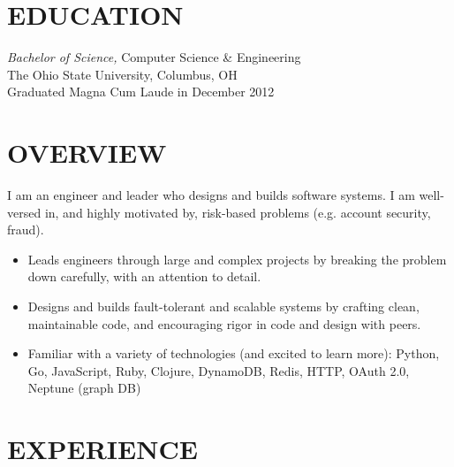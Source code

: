 \documentclass[line,letterpaper]{resume}
\begin{document}
\address{\href{https://www.ryanmcg.com}{Personal website --- https://www.ryanmcg.com}}
\address{\href{mailto:ryan@ryanmcg.com}{ryan@ryanmcg.com}}


\begin{resume}
    \vspace{-12pt}
    \section{\uppercase{Education}}

    \vspace{6pt}
    {\sl Bachelor of Science,} \/
    Computer Science \& Engineering \\
    The Ohio State University, Columbus, OH \\
    Graduated Magna Cum Laude in December 2012 \\

    \vspace{-10pt}

    \section{\uppercase{Overview}}
    \vspace{6pt}

    I am an engineer and leader who designs and builds software systems.
    I am well-versed in, and highly motivated by, risk-based problems (e.g. account security, fraud).
    \vspace{6pt}
    \begin{itemize}
        \item Leads engineers through large and complex projects by breaking the
            problem down carefully, with an attention to detail.
        \item Designs and builds fault-tolerant and scalable systems by crafting
            clean, maintainable code, and encouraging rigor in code and design
            with peers.
        \item Familiar with a variety of technologies (and excited to learn more): Python, Go, JavaScript,
            Ruby, Clojure, DynamoDB, Redis, HTTP, OAuth 2.0, Neptune (graph DB)
    \end{itemize}

    \vspace{6pt}

    \section{\uppercase{Experience}}
    \vspace{6pt}


\end{resume}
\end{document}
